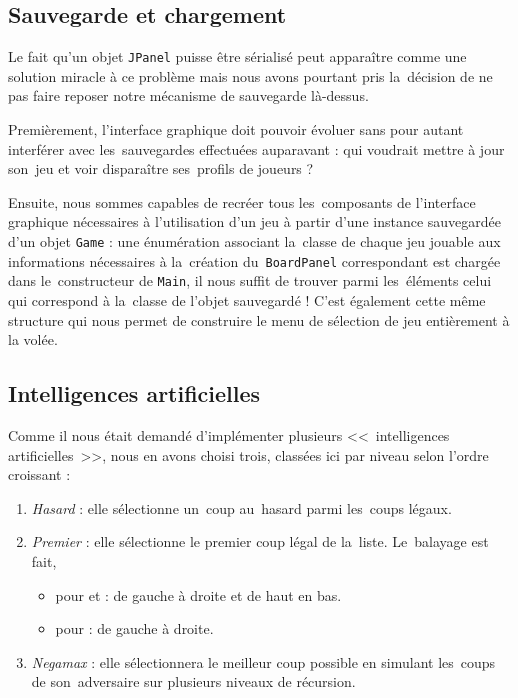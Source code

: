 \subsection{Sauvegarde et chargement}
Le fait qu'un objet \texttt{JPanel} puisse être sérialisé peut apparaître comme une solution miracle à ce problème 
mais nous avons pourtant pris la~décision de ne pas faire reposer notre mécanisme de sauvegarde là-dessus.

Premièrement, l'interface graphique doit pouvoir évoluer sans pour autant interférer avec les~sauvegardes effectuées auparavant : 
qui voudrait mettre à jour son~jeu et voir disparaître ses~profils de joueurs ?

Ensuite, nous sommes capables de recréer tous les~composants de l'interface graphique nécessaires à l'utilisation d'un jeu 
à partir d'une instance sauvegardée d'un objet \texttt{Game} : une énumération associant la~classe de chaque jeu jouable 
aux informations nécessaires à la~création du~\texttt{BoardPanel} correspondant est chargée dans le~constructeur de \texttt{Main}, 
il nous suffit de trouver parmi les~éléments celui qui correspond à la~classe de l'objet sauvegardé ! C'est également cette même structure 
qui nous permet de construire le menu de sélection de jeu entièrement à la volée.


\subsection{Intelligences artificielles}
Comme il nous était demandé d'implémenter plusieurs <<~intelligences artificielles~>>, 
nous en avons choisi trois, classées ici par niveau selon l'ordre croissant :

\begin{enumerate}
	\item \emph{Hasard} : elle sélectionne un~coup au~hasard parmi les~coups légaux.
    \item \emph{Premier} : elle sélectionne le premier coup légal de la~liste. Le~balayage est fait,
    \begin{itemize}
        \item pour \oth{} et \ttt{} : de gauche à droite et de haut en bas.
        \item pour \cf{} : de gauche à droite.
    \end{itemize}
    \item \emph{Negamax} : elle sélectionnera le meilleur coup possible en simulant les~coups de son~adversaire sur plusieurs niveaux de récursion.
\end{enumerate}